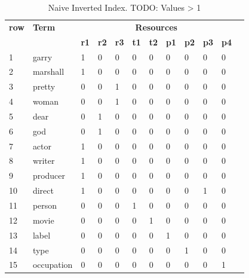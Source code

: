 \documentclass{sig-alternate-05-2015}
\begin{document}
\begin{table}[htbp]
\caption{Naive Inverted Index. TODO: Values > 1} %
\label{tab:Resource-based-Inverted-Index}
\centering
\scriptsize
\begin{tabular}{llllllllllll}
\textbf{row} & \textbf{Term}  & \multicolumn{9}{c}{\textbf{Resources}} \\
\cline{3-11}
& & \textbf{r1} & \textbf{r2} & \textbf{r3}  & \textbf{t1} & \textbf{t2} & \textbf{p1} & \textbf{p2}& \textbf{p3}& \textbf{p4}\\
1 & garry    & 1          & 0         & 0 &  0   &   0 &   0 &   0 &   0 &   0\\
2   &   marshall & 1          & 0         & 0 &  0   &   0 &   0 &   0 &   0 &   0\\
3   &   pretty & 0          & 0         & 1 &  0   &   0 &   0 &   0 &   0 &   0\\
4   &   woman & 0         & 0        & 1 &  0   &   0 &   0 &   0 &   0 &   0\\
5   &   dear & 0          & 1         & 0 &  0   &   0 &   0 &   0 &   0 &   0\\
6   &   god  & 0          & 1         & 0 &  0   &   0 &   0 &   0 &   0 &   0\\
7   &   actor & 1          & 0         & 0 &  0   &   0 &   0 &   0 &   0 &   0\\
8   &   writer & 1          & 0         & 0 &  0   &   0 &   0 &   0 &   0 &   0\\
9   &   producer & 1          & 0         & 0 &  0   &   0 &   0 &   0 &   0 &   0\\
10   &   direct & 1          & 0         & 0 &  0   &   0 &   0 &   0 &   1 &   0\\
11   &   person & 0          & 0         & 0 &  1   &   0 &   0 &   0 &   0 &   0\\
12  &   movie & 0          & 0         & 0 &  0   &   1 &   0 &   0 &   0 &   0\\
13   &   label    & 0          & 0         & 0 &  0   &   0 &   1 &   0 &   0 &   0\\
14   &   type     & 0          & 0         & 0 &  0   &   0 &   0 &   1 &   0 &   0\\
15   &   occupation & 0          & 0         & 0 &  0   &   0 &   0 &   0 &   0 &   1\\
\end{tabular}
\end{table}
\end{document}
